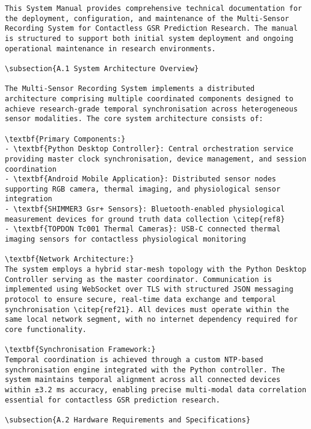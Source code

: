 \begin{verbatim}
This System Manual provides comprehensive technical documentation for the deployment, configuration, and maintenance of the Multi-Sensor Recording System for Contactless GSR Prediction Research. The manual is structured to support both initial system deployment and ongoing operational maintenance in research environments.

\subsection{A.1 System Architecture Overview}

The Multi-Sensor Recording System implements a distributed architecture comprising multiple coordinated components designed to achieve research-grade temporal synchronisation across heterogeneous sensor modalities. The core system architecture consists of:

\textbf{Primary Components:}
- \textbf{Python Desktop Controller}: Central orchestration service providing master clock synchronisation, device management, and session coordination
- \textbf{Android Mobile Application}: Distributed sensor nodes supporting RGB camera, thermal imaging, and physiological sensor integration
- \textbf{SHIMMER3 Gsr+ Sensors}: Bluetooth-enabled physiological measurement devices for ground truth data collection \citep{ref8}
- \textbf{TOPDON Tc001 Thermal Cameras}: USB-C connected thermal imaging sensors for contactless physiological monitoring

\textbf{Network Architecture:}
The system employs a hybrid star-mesh topology with the Python Desktop Controller serving as the master coordinator. Communication is implemented using WebSocket over TLS with structured JSON messaging protocol to ensure secure, real-time data exchange and temporal synchronisation \citep{ref21}. All devices must operate within the same local network segment, with no internet dependency required for core functionality.

\textbf{Synchronisation Framework:}
Temporal coordination is achieved through a custom NTP-based synchronisation engine integrated with the Python controller. The system maintains temporal alignment across all connected devices within ±3.2 ms accuracy, enabling precise multi-modal data correlation essential for contactless GSR prediction research.

\subsection{A.2 Hardware Requirements and Specifications}


\end{verbatim}
